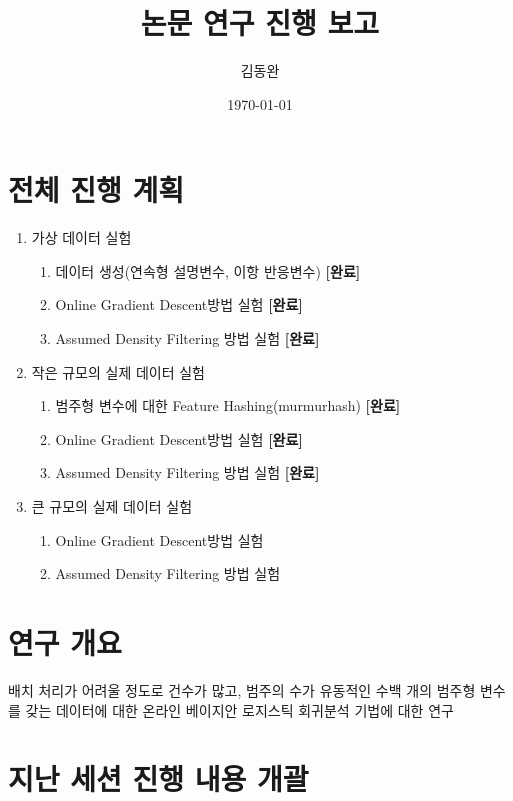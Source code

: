 \documentclass[oneside,b5paper,11pt]{article} %
\title{논문 연구 진행 보고}
\author{김동완}
\date{\today}
\begin{document}


\maketitle

\section{전체 진행 계획}
\begin{enumerate}
	\item 가상 데이터 실험
	\begin{enumerate}
		\item 데이터 생성(연속형 설명변수, 이항 반응변수) \textbf{[완료]}
		\item Online Gradient Descent방법 실험 \textbf{[완료]}
		\item Assumed Density Filtering 방법 실험 \textbf{[완료]}
	\end{enumerate}

	\item 작은 규모의 실제 데이터 실험
	\begin{enumerate}
		\item 범주형 변수에 대한 Feature Hashing(murmurhash) \textbf{[완료]}
		\item Online Gradient Descent방법 실험 \textbf{[완료]}
		\item Assumed Density Filtering 방법 실험 \textbf{[완료]}
	\end{enumerate}
	
	\item 큰 규모의 실제 데이터 실험
	\begin{enumerate}
		\item Online Gradient Descent방법 실험
		\item Assumed Density Filtering 방법 실험
	\end{enumerate}

\end{enumerate}

 
 
\section{연구 개요}
 배치 처리가 어려울 정도로 건수가 많고, 범주의 수가 유동적인 수백 개의 범주형 변수를 갖는 데이터에 대한 온라인 베이지안 로지스틱 회귀분석 기법에 대한 연구



\section{지난 세션 진행 내용 개괄}
\end{document}
